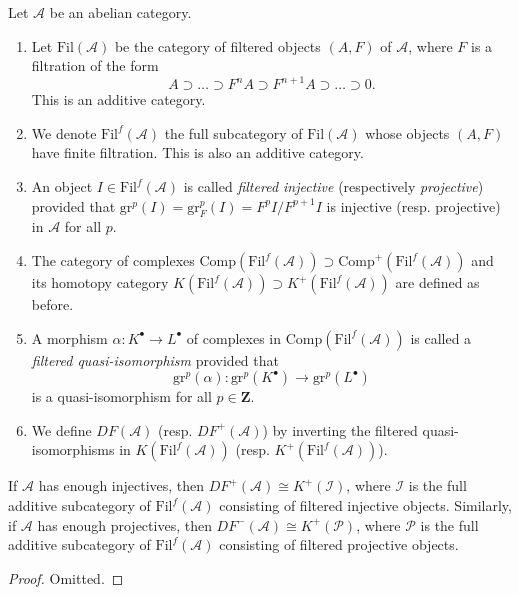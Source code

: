 \begin{definition}
\label{definition-filtered}
Let $\mathcal{A}$ be an abelian category.
\begin{enumerate}
\item Let $\text{Fil}(\mathcal{A})$ be the category of filtered objects
$(A, F)$ of $\mathcal{A}$, where $F$ is a filtration of the form
$$
A \supset \ldots \supset F^n A \supset F^{n+1}A \supset \ldots
\supset 0.
$$
This is an additive category.
\item We denote $\text{Fil}^f(\mathcal{A})$ the full
subcategory of $\text{Fil}(\mathcal{A})$ whose objects $(A, F)$ have finite
filtration. This is also an additive category.
\item An object $I \in \text{Fil}^f(\mathcal{A})$ is called
{\it filtered injective} (respectively {\it projective}) provided
that $\text{gr}^p(I) = \text{gr}_F^p(I) = F^pI/F^{p+1}I$ is injective
(resp. projective) in $\mathcal{A}$ for all $p$.
\item The category of complexes
$\text{Comp}(\text{Fil}^f(\mathcal{A})) \supset
\text{Comp}^+(\text{Fil}^f(\mathcal{A}))$
and its homotopy category
$K(\text{Fil}^f(\mathcal{A})) \supset K^+(\text{Fil}^f(\mathcal A))$
are defined as before.
\item A morphism $\alpha : K^\bullet \to L^\bullet$ of complexes in
$\text{Comp}(\text{Fil}^f(\mathcal{A}))$ is called a
{\it filtered quasi-isomorphism} provided that
$$
\text{gr}^p(\alpha): \text{gr}^p(K^\bullet) \to \text{gr}^p(L^\bullet)
$$
is a quasi-isomorphism for all $p \in \mathbf{Z}$.
\item We define $DF(\mathcal{A})$ (resp. $DF^+(\mathcal{A})$)
by inverting the filtered quasi-isomorphisms in
$K(\text{Fil}^f(\mathcal{A}))$ (resp. $K^+(\text{Fil}^f(\mathcal{A}))$).
\end{enumerate}
\end{definition}

\begin{lemma}
\label{lemma-filtered-derived-category}
If $\mathcal{A}$ has enough injectives, then $DF^+(\mathcal{A}) \cong
K^+(\mathcal{I})$, where $\mathcal{I}$ is the full additive subcategory of
$\text{Fil}^f(\mathcal{A})$ consisting of filtered injective objects.
Similarly, if $\mathcal{A}$ has enough projectives, then $DF^-(\mathcal{A})
\cong K^+(\mathcal{P})$, where $\mathcal P$ is the full additive subcategory of
$\text{Fil}^f(\mathcal{A})$ consisting of filtered projective objects.
\end{lemma}

\begin{proof}
Omitted.
\end{proof}





